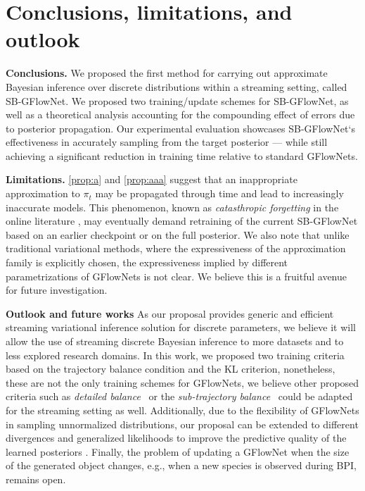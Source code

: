 \documentclass{article}
\newcommand{\pp}[1]{\vspace{0pt}\noindent\textbf{#1}}
\theoremstyle{plain}
\theoremstyle{definition}
\theoremstyle{remark}
\theoremstyle{remark}
\begin{document}
\section{Conclusions, limitations, and outlook} \label{sec:aaa} 



\pp{Conclusions.} We proposed the first method for carrying out approximate Bayesian inference over discrete distributions within a streaming setting, called SB-GFlowNet. We proposed two training/update schemes for SB-GFlowNet, as well as a theoretical analysis accounting for the compounding effect of errors due to posterior propagation. 
%
Our experimental evaluation showcases SB-GFlowNet`s effectiveness in accurately sampling from the target posterior --- while still achieving a significant reduction in training time relative to standard GFlowNets.
%

\pp{Limitations.} \autoref{prop:a} and \autoref{prop:aaa} suggest that an inappropriate approximation to $\pi_{t}$ may be propagated through time and lead to increasingly inaccurate models. This phenomenon, known as \emph{catasthropic forgetting} in the online literature \cite{McCloskey1989,Goodfellow2014}, may eventually demand retraining of the current SB-GFlowNet based on an earlier checkpoint or on the full posterior.
%
We also note that unlike traditional variational methods, where the expressiveness of the approximation family is explicitly chosen, the expressiveness implied by different parametrizations of GFlowNets is not clear. We believe this is a fruitful avenue for future investigation.


\pp{Outlook and future works}
As our proposal provides generic and efficient streaming variational inference solution for discrete parameters, we believe it will allow the use of streaming discrete Bayesian inference to more datasets and to less explored research domains.
% 
In this work, we proposed two training criteria based on the trajectory balance condition and the KL criterion, nonetheless, these are not the only training schemes for GFlowNets, we believe other proposed criteria such as \emph{detailed balance}~\citep{Foundations} or the \emph{sub-trajectory balance}~\cite{Madan2022LearningGF} could be adapted for the streaming setting as well.
%
Additionally, due to the flexibility of GFlowNets in sampling unnormalized distributions, our proposal can be extended to different divergences and generalized likelihoods to improve the predictive quality of the learned posteriors \cite{Knoblauch2022}. Finally, the problem of updating a GFlowNet when the size of the generated object changes, e.g., when a new species is observed during BPI, remains open.    
\end{document}
